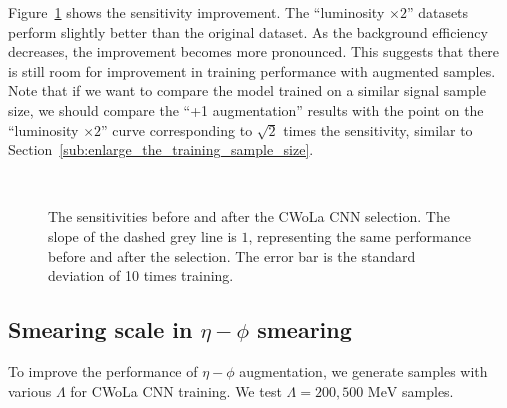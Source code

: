 \documentclass[12pt]{article}
\begin{document}
		Figure~\ref{fig:sensitivity_improvement_origin_aug_1_x2} shows the sensitivity improvement. The ``luminosity $\times 2$'' datasets perform slightly better than the original dataset. As the background efficiency decreases, the improvement becomes more pronounced. This suggests that there is still room for improvement in training performance with augmented samples. Note that if we want to compare the model trained on a similar signal sample size, we should compare the ``+1 augmentation'' results with the point on the ``luminosity $\times 2$'' curve corresponding to $\sqrt{2}$ times the sensitivity, similar to Section~\ref{sub:enlarge_the_training_sample_size}. 
		\begin{figure}[htpb]
			\centering
			 \\
			\caption{The sensitivities before and after the CWoLa CNN selection. The slope of the dashed grey line is $1$, representing the same performance before and after the selection. The error bar is the standard deviation of 10 times training.}
			\label{fig:sensitivity_improvement_origin_aug_1_x2}
		\end{figure}
	\subsection{Smearing scale in \texorpdfstring{$\eta-\phi$}{eta-phi} smearing}%
	\label{sub:smearing_scale_in_eta_phi_smearing}
		To improve the performance of $\eta-\phi$ augmentation, we generate samples with various $\Lambda$ for CWoLa CNN training. We test $\Lambda = 200, 500 \text{ MeV}$ samples.
\end{document}
